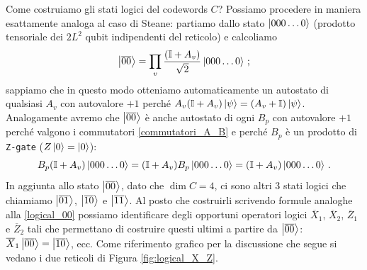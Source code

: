 \noindent Come costruiamo gli stati logici del codewords $C$? Possiamo procedere in maniera esattamente analoga al caso di Steane: partiamo dallo stato $\ket{000 \ldots 0}$ (prodotto tensoriale dei $2L^2$ qubit indipendenti del reticolo) e calcoliamo 
\begin{equation}\label{logical_00}
    \ket{\overline{00}} = \prod_v \frac{(\mathbb{I}+A_v)}{\sqrt{2}} \ket{000 \ldots 0} \, ;
\end{equation}
sappiamo che in questo modo otteniamo automaticamente un autostato di qualsiasi $A_v$ con autovalore $+1$ perché $A_v (\mathbb{I} + A_v) \ket{\psi} = (A_v + \mathbb{I}) \ket{\psi}$. Analogamente avremo che $\ket{\overline{00}}$ è anche autostato di ogni $B_p$ con autovalore $+1$ perché valgono i commutatori \eqref{commutatori_A_B} e perché $B_p$ è un prodotto di \texttt{Z-gate} ($Z \ket{0} = \ket{0}$):
\begin{equation*}
    B_p (\mathbb{I} + A_v) \ket{000 \ldots 0} = (\mathbb{I} + A_v) B_p \ket{000 \ldots 0} = (\mathbb{I} + A_v) \ket{000 \ldots 0} \, .
\end{equation*}
In aggiunta allo stato $\ket{\overline{00}}$, dato che $\dim C = 4$, ci sono altri 3 stati logici che chiamiamo $\ket{\overline{01}}$, $\ket{\overline{10}}$ e $\ket{\overline{11}}$. Al posto che costruirli scrivendo formule analoghe alla \eqref{logical_00} possiamo identificare degli opportuni operatori logici $\overline{X}_1$, $\overline{X}_2$, $\overline{Z}_1$ e $\overline{Z}_2$ tali che permettano di costruire questi ultimi a partire da $\ket{\overline{00}}$: $\overline{X}_1 \ket{\overline{00}} = \ket{\overline{10}}$, ecc. Come riferimento grafico per la discussione che segue si vedano i due reticoli di Figura \ref{fig:logical_X_Z}.   

